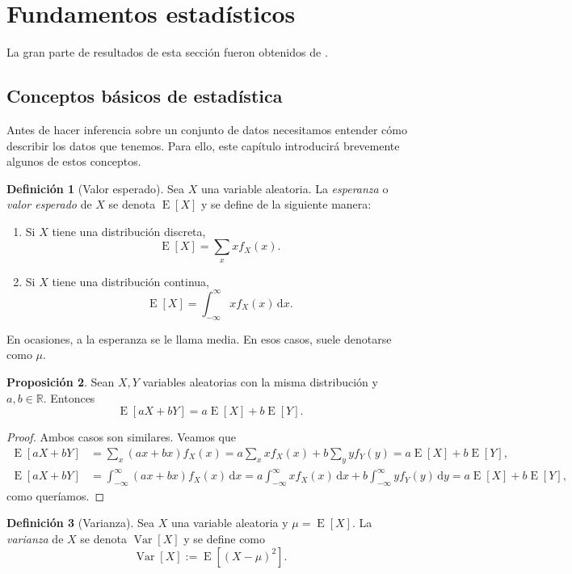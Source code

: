 \documentclass[11pt,letterpaper]{article}
\newcommand{\dif}{\ensuremath{\,\mathrm{d}}}
\newcommand{\expected}{\ensuremath{\operatorname{E}}}
\newcommand{\variance}{\ensuremath{\operatorname{Var}}}
\theoremstyle{definition}
\newtheorem{definition}{Definición}[section]
\theoremstyle{theorem}
\newtheorem{proposition}[definition]{Proposición}
\theoremstyle{remark}
\begin{document}
	\section{Fundamentos estadísticos}
	\noindent La gran parte de resultados de esta sección fueron obtenidos de \autocite{hoggmckeancraig}.
	\subsection{Conceptos básicos de estadística}
	\noindent\justify Antes de hacer inferencia sobre un conjunto de datos necesitamos entender cómo describir los datos que tenemos. Para ello, este capítulo introducirá brevemente algunos de estos conceptos.
	\begin{definition}[Valor esperado]
		Sea \(X\) una variable aleatoria. La \textit{esperanza} o \textit{valor esperado} de \(X\) se denota \(\expected[X]\) y se define de la siguiente manera:
		\begin{enumerate}
			\item Si \(X\) tiene una distribución discreta, \[\expected[X]=\sum_xxf_X(x).\]
			\item Si \(X\) tiene una distribución continua, \[\expected[X]=\int_{-\infty}^{\infty}xf_X(x)\dif x.\]
		\end{enumerate}
		En ocasiones, a la esperanza se le llama media. En esos casos, suele denotarse como \(\mu\).
	\end{definition}
	\begin{proposition}
		Sean \(X,Y\) variables aleatorias con la misma distribución y \(a,b\in\mathbb{R}\). Entonces \[\expected[aX+bY]=a\expected[X]+b\expected[Y].\]
	\end{proposition}
	\begin{proof}
		Ambos casos son similares. Veamos que
		\begin{align*}
			\expected[aX+bY]&=\sum_x(ax+bx)f_X(x)=a\sum_xxf_X(x)+b\sum_yyf_Y(y)=a\expected[X]+b\expected[Y], \\
			\expected[aX+bY]&=\int_{-\infty}^{\infty}(ax+bx)f_X(x)\dif x=a\int_{-\infty}^{\infty}xf_X(x)\dif x+b\int_{-\infty}^{\infty}yf_Y(y)\dif y=a\expected[X]+b\expected[Y],
		\end{align*}
		como queríamos.
	\end{proof}
	\begin{definition}[Varianza]
		Sea \(X\) una variable aleatoria y \(\mu=\expected[X]\). La \textit{varianza} de \(X\) se denota \(\variance[X]\) y se define como \[\variance[X]:=\expected\left[(X-\mu)^2\right].\]
	\end{definition}
\end{document}
